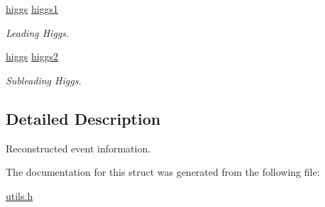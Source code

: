 \begin{DoxyCompactItemize}
\mbox{\label{structreconstructed__event_ad975097d7e4fede270dac3a22e8e4b37}} 
\mbox{\hyperlink{structhiggs}{higgs}} \mbox{\hyperlink{structreconstructed__event_ad975097d7e4fede270dac3a22e8e4b37}{higgs1}}
\begin{DoxyCompactList}\small\item\em Leading Higgs. \end{DoxyCompactList}\item 
\mbox{\label{structreconstructed__event_ad6d6ed5377c2af5ae384ab07e335e5d4}} 
\mbox{\hyperlink{structhiggs}{higgs}} \mbox{\hyperlink{structreconstructed__event_ad6d6ed5377c2af5ae384ab07e335e5d4}{higgs2}}
\begin{DoxyCompactList}\small\item\em Subleading Higgs. \end{DoxyCompactList}\end{DoxyCompactItemize}


\subsection{Detailed Description}
Reconstructed event information. 

The documentation for this struct was generated from the following file\+:\begin{DoxyCompactItemize}
\item 
\mbox{\hyperlink{utils_8h}{utils.\+h}}\end{DoxyCompactItemize}
